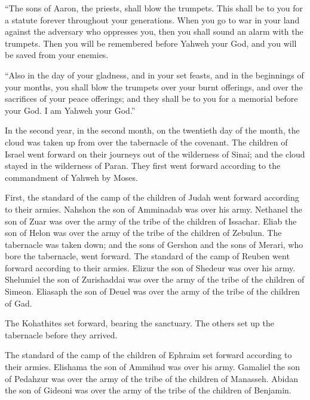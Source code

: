  ``The sons of Aaron, the priests, shall blow the trumpets.
This shall be to you for a statute forever throughout your generations.
 When you go to war in your land against the adversary who
oppresses you, then you shall sound an alarm with the trumpets. Then you
will be remembered before Yahweh your God, and you will be saved from
your enemies.

 ``Also in the day of your gladness, and in your set
feasts, and in the beginnings of your months, you shall blow the
trumpets over your burnt offerings, and over the sacrifices of your
peace offerings; and they shall be to you for a memorial before your
God. I am Yahweh your God.''

 In the second year, in the second month, on the twentieth
day of the month, the cloud was taken up from over the tabernacle of the
covenant.  The children of Israel went forward on their
journeys out of the wilderness of Sinai; and the cloud stayed in the
wilderness of Paran.  They first went forward according to
the commandment of Yahweh by Moses.

 First, the standard of the camp of the children of Judah
went forward according to their armies. Nahshon the son of Amminadab was
over his army.  Nethanel the son of Zuar was over the army
of the tribe of the children of Issachar.  Eliab the son of
Helon was over the army of the tribe of the children of Zebulun.
 The tabernacle was taken down; and the sons of Gershon and
the sons of Merari, who bore the tabernacle, went forward. 
The standard of the camp of Reuben went forward according to their
armies. Elizur the son of Shedeur was over his army. 
Shelumiel the son of Zurishaddai was over the army of the tribe of the
children of Simeon.  Eliasaph the son of Deuel was over the
army of the tribe of the children of Gad.

 The Kohathites set forward, bearing the sanctuary. The
others set up the tabernacle before they arrived.

 The standard of the camp of the children of Ephraim set
forward according to their armies. Elishama the son of Ammihud was over
his army.  Gamaliel the son of Pedahzur was over the army
of the tribe of the children of Manasseh.  Abidan the son
of Gideoni was over the army of the tribe of the children of Benjamin.

